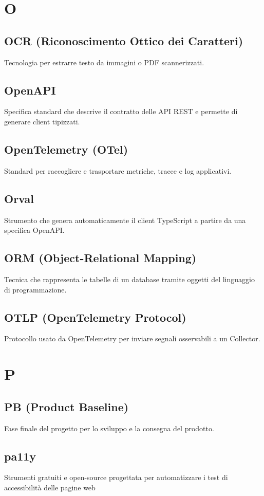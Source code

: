 \documentclass[a4paper,12pt]{article}
\begin{document}
\section{O}
\subsection{OCR (Riconoscimento Ottico dei Caratteri)}
Tecnologia per estrarre testo da immagini o PDF scannerizzati.

\subsection{OpenAPI}
Specifica standard che descrive il contratto delle API REST e permette di generare client tipizzati.

\subsection{OpenTelemetry (OTel)}
Standard per raccogliere e trasportare metriche, tracce e log applicativi.

\subsection{Orval}
Strumento che genera automaticamente il client TypeScript a partire da una specifica OpenAPI.

\subsection{ORM (Object-Relational Mapping)}
Tecnica che rappresenta le tabelle di un database tramite oggetti del linguaggio di programmazione.

\subsection{OTLP (OpenTelemetry Protocol)}
Protocollo usato da OpenTelemetry per inviare segnali osservabili a un Collector.

\section{P}
\subsection{PB (Product Baseline)}
Fase finale del progetto per lo sviluppo e la consegna del prodotto.

\subsection{pa11y}
Strumenti gratuiti e open-source progettata per automatizzare i test di accessibilità delle pagine web
\end{document}
